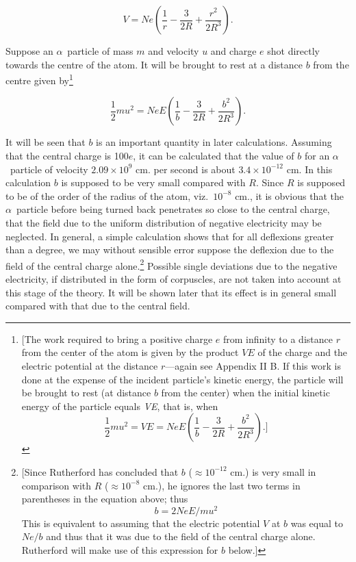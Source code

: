 \begin{equation*}
V = Ne\left(\frac{1}{r} - \frac{3}{2R} + \frac{r^2}{2R^3}\right).
\end{equation*}

Suppose an $\alpha$~particle of mass $m$ and velocity $u$\label{uRuth} and
charge $e$ shot directly towards the centre of the atom. It will be
brought to rest at a distance $b$ from the centre given
by\footnote{{[}The work required to bring a positive charge $e$
  from infinity to a distance $r$ from the center of the atom is
  given by the product $VE$ of the charge and the electric
  potential at the distance $r$---again see Appendix II B. If this
  work is done at the expense of the incident particle's kinetic energy,
  the particle will be brought to rest (at distance $b$ from the
  center) when the initial kinetic energy of the particle equals
  \emph{VE}, that is, when
  \begin{equation*}
  \frac{1}{2}mu^2 = VE = NeE\left(\frac{1}{b}-\frac{3}{2R}+\frac{b^2}{2R^3}\right).]
  \end{equation*}}

\begin{equation*}
\frac{1}{2}mu^2 = NeE\left(\frac{1}{b} - \frac{3}{2R} + \frac{b^2}{2R^3}\right).
\end{equation*}

It will be seen that $b$ is an important quantity in later
calculations. Assuming that the central charge is 100$e$, it can be
calculated that the value of $b$ for an $\alpha$~particle of
velocity $2.09 \times 10^9$ cm. per second is about $3.4 \times 10^{-12}$ cm. In this
calculation $b$ is supposed to be very small compared with
$R$. Since $R$ is supposed to be of the order of the radius of
the atom, viz.\ $10^{-8}$ cm., it is obvious that the $\alpha$~particle before
being turned back penetrates so close to the central charge, that the
field due to the uniform distribution of negative electricity may be
neglected. In general, a simple calculation shows that for all
deflexions greater than a degree, we may without sensible error suppose
the deflexion due to the field of the central charge alone.\footnote{{[}Since
  Rutherford has concluded that $b$ ($\approx 10^{-12}$ cm.)
  is very small in comparison with $R$ ($\approx 10^{-8}$
  cm.), he ignores the last two terms in parentheses in the equation
  above; thus
  \begin{equation*}
  b = 2NeE/mu^2
  \end{equation*}
  This is equivalent to assuming that the electric potential $V$ at
  $b$ was equal to $Ne/b$ and thus that it was due to the
  field of the central charge alone. Rutherford will make use of this
  expression for $b$ below.]} Possible single deviations 
  due to the negative electricity, if distributed in the form
of corpuscles, are not taken into account at this stage of the theory.
It will be shown later that its effect is in general small compared with
that due to the central field.

